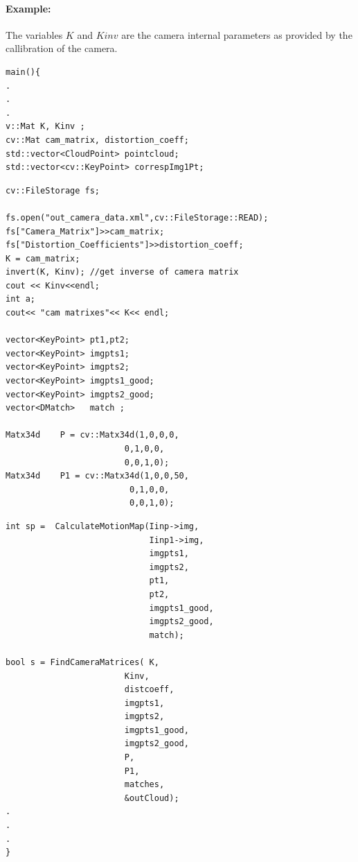 \paragraph{Example:}
The variables $K$ and $Kinv$ are the camera internal parameters as provided by the callibration of the camera.
\begin{lstlisting}
main(){
.
.
.
v::Mat K, Kinv ;
cv::Mat cam_matrix, distortion_coeff;
std::vector<CloudPoint> pointcloud;
std::vector<cv::KeyPoint> correspImg1Pt;
\end{lstlisting}
\pagebreak
\begin{lstlisting}
cv::FileStorage fs;

fs.open("out_camera_data.xml",cv::FileStorage::READ);
fs["Camera_Matrix"]>>cam_matrix;
fs["Distortion_Coefficients"]>>distortion_coeff;
K = cam_matrix;
invert(K, Kinv); //get inverse of camera matrix
cout << Kinv<<endl;
int a;
cout<< "cam matrixes"<< K<< endl;

vector<KeyPoint> pt1,pt2;
vector<KeyPoint> imgpts1;
vector<KeyPoint> imgpts2;
vector<KeyPoint> imgpts1_good;
vector<KeyPoint> imgpts2_good;
vector<DMatch>   match ;

Matx34d    P = cv::Matx34d(1,0,0,0,
                        0,1,0,0,
                        0,0,1,0);
Matx34d    P1 = cv::Matx34d(1,0,0,50,
                         0,1,0,0,
                         0,0,1,0);
\end{lstlisting}
\pagebreak
\begin{lstlisting}
int sp =  CalculateMotionMap(Iinp->img, 
							 Iinp1->img, 
							 imgpts1, 
							 imgpts2, 
							 pt1, 
							 pt2, 
							 imgpts1_good,
							 imgpts2_good,
							 match);

bool s = FindCameraMatrices( K, 
						Kinv, 
						distcoeff, 
						imgpts1, 
						imgpts2, 
						imgpts1_good, 
						imgpts2_good, 
						P, 
						P1, 
						matches, 
						&outCloud); 
.
.
.
}
\end{lstlisting}

